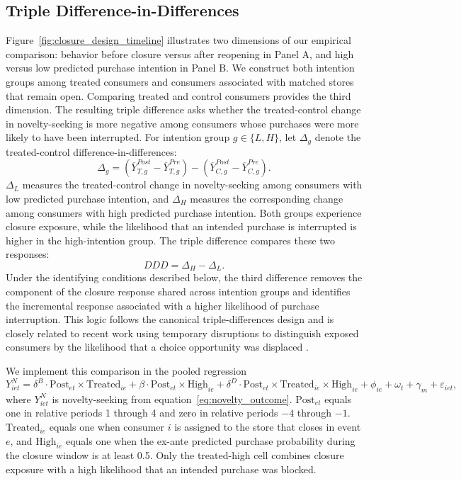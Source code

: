 \documentclass[11 pt]{article}
\begin{document}
\subsection{Triple Difference-in-Differences}
\label{section:3.3}

Figure~\ref{fig:closure_design_timeline} illustrates two dimensions of our empirical comparison: behavior before closure versus after reopening in Panel A, and high versus low predicted purchase intention in Panel B. We construct both intention groups among treated consumers and consumers associated with matched stores that remain open. Comparing treated and control consumers provides the third dimension. The resulting triple difference asks whether the treated-control change in novelty-seeking is more negative among consumers whose purchases were more likely to have been interrupted. For intention group $g\in\{L,H\}$, let $\Delta_g$ denote the treated-control difference-in-differences:
\begin{equation}
\Delta_g
=
\left(\overline{Y}_{T,g}^{Post}-\overline{Y}_{T,g}^{Pre}\right)
-
\left(\overline{Y}_{C,g}^{Post}-\overline{Y}_{C,g}^{Pre}\right).
\label{eq:group_did}
\end{equation}
$\Delta_L$ measures the treated-control change in novelty-seeking among consumers with low predicted purchase intention, and $\Delta_H$ measures the corresponding change among consumers with high predicted purchase intention. Both groups experience closure exposure, while the likelihood that an intended purchase is interrupted is higher in the high-intention group. The triple difference compares these two responses:
\begin{equation}
DDD=\Delta_H-\Delta_L.
\label{eq:ddd_intuition}
\end{equation}
Under the identifying conditions described below, the third difference removes the component of the closure response shared across intention groups and identifies the incremental response associated with a higher likelihood of purchase interruption. This logic follows the canonical triple-differences design \citep{Gruber1994} and is closely related to recent work using temporary disruptions to distinguish exposed consumers by the likelihood that a choice opportunity was displaced \citep{Levine2026}.

We implement this comparison in the pooled regression
\begin{equation}
Y^N_{iet}
=
\delta^B \cdot \text{Post}_{et} \times \text{Treated}_{ie}
+
\beta \cdot \text{Post}_{et} \times \text{High}_{ie}
+
\delta^D \cdot \text{Post}_{et} \times \text{Treated}_{ie} \times \text{High}_{ie}
+
\phi_{ie}+\omega_t+\gamma_m+\varepsilon_{iet},
\label{eq:main_ddd}
\end{equation}
where $Y^N_{iet}$ is novelty-seeking from equation~\eqref{eq:novelty_outcome}. $\text{Post}_{et}$ equals one in relative periods 1 through 4 and zero in relative periods $-4$ through $-1$. $\text{Treated}_{ie}$ equals one when consumer $i$ is assigned to the store that closes in event $e$, and $\text{High}_{ie}$ equals one when the ex-ante predicted purchase probability during the closure window is at least 0.5. Only the treated-high cell combines closure exposure with a high likelihood that an intended purchase was blocked.
\end{document}
